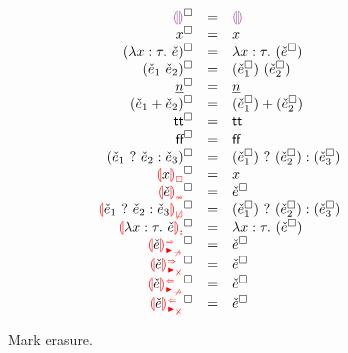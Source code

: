 \newcommand{\erasesToRow}[2]{\erase{#1} & = & #2}
\begin{figure}[htbp]
  \[\begin{array}{rcl}
    \erasesToRow{\ECEHole}{\EEHole} \\
    \erasesToRow{x}{x} \\
    \erasesToRow{(\ECLam{x}{\TMV}{\ECMV})}{\ELam{x}{\TMV}{(\erase{\ECMV})}} \\
    \erasesToRow{(\ECAp{\ECMV_1}{\ECMV_2})}{\EAp{(\erase{\ECMV_1})}{(\erase{\ECMV_2})}} \\
    \erasesToRow{\ECNumMV}{\ENumMV} \\
    \erasesToRow{(\ECPlus{\ECMV_1}{\ECMV_2})}{\EPlus{(\erase{\ECMV_1})}{(\erase{\ECMV_2})}} \\
    \erasesToRow{\ECTrue}{\ETrue} \\
    \erasesToRow{\ECFalse}{\EFalse} \\
    \erasesToRow{(\ECIf{\ECMV_1}{\ECMV_2}{\ECMV_3})}{\EIf{(\erase{\ECMV_1})}{(\erase{\ECMV_2})}{(\erase{\ECMV_3})}} \\
    \erasesToRow{\ECUnbound{x}}{x} \\
    \erasesToRow{\ECInconType{\ECMV}}{\erase{\ECMV}} \\
    \erasesToRow{\ECInconBr{\ECMV_1}{\ECMV_2}{\ECMV_3}}{\EIf{(\erase{\ECMV_1})}{(\erase{\ECMV_2})}{(\erase{\ECMV_3})}} \\
    \erasesToRow{\ECLamInconAsc{x}{\TMV}{\ECMV}}{\ELam{x}{\TMV}{(\erase{\ECMV})}} \\
    \erasesToRow{\ECSynNonMatchedArrow{\ECMV}}{\erase{\ECMV}} \\
    \erasesToRow{\ECSynNonMatchedProd{\ECMV}}{\erase{\ECMV}} \\
    \erasesToRow{\ECAnaNonMatchedArrow{\ECMV}}{\erase{\ECMV}} \\
    \erasesToRow{\ECAnaNonMatchedProd{\ECMV}}{\erase{\ECMV}} \\
  \end{array}\]
  \caption{Mark erasure.}
  \label{fig:calculus-mark-erasure}
\end{figure}
